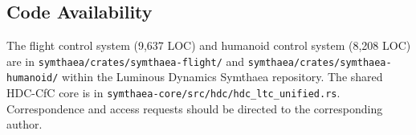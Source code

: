 \documentclass[11pt,a4paper]{article}
\begin{document}
\subsection*{Code Availability}

The flight control system (9,637 LOC) and humanoid control system (8,208 LOC) are in \texttt{symthaea/crates/symthaea-flight/} and \texttt{symthaea/crates/symthaea-humanoid/} within the Luminous Dynamics Symthaea repository. The shared HDC-CfC core is in \texttt{symthaea-core/src/hdc/hdc\_ltc\_unified.rs}. Correspondence and access requests should be directed to the corresponding author.



\end{document}

